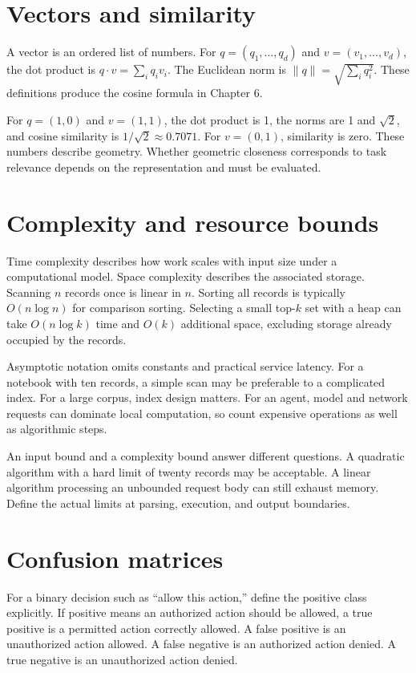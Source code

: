 \section{Vectors and similarity}
A vector is an ordered list of numbers. For \(q=(q_1,\ldots,q_d)\) and \(v=(v_1,\ldots,v_d)\), the dot product is \(q\cdot v=\sum_i q_i v_i\). The Euclidean norm is \(\lVert q\rVert=\sqrt{\sum_i q_i^2}\). These definitions produce the cosine formula in Chapter 6.

For \(q=(1,0)\) and \(v=(1,1)\), the dot product is 1, the norms are 1 and \(\sqrt{2}\), and cosine similarity is \(1/\sqrt{2}\approx0.7071\). For \(v=(0,1)\), similarity is zero. These numbers describe geometry. Whether geometric closeness corresponds to task relevance depends on the representation and must be evaluated.

\section{Complexity and resource bounds}
Time complexity describes how work scales with input size under a computational model. Space complexity describes the associated storage. Scanning \(n\) records once is linear in \(n\). Sorting all records is typically \(O(n\log n)\) for comparison sorting. Selecting a small top-\(k\) set with a heap can take \(O(n\log k)\) time and \(O(k)\) additional space, excluding storage already occupied by the records.

Asymptotic notation omits constants and practical service latency. For a notebook with ten records, a simple scan may be preferable to a complicated index. For a large corpus, index design matters. For an agent, model and network requests can dominate local computation, so count expensive operations as well as algorithmic steps.

An input bound and a complexity bound answer different questions. A quadratic algorithm with a hard limit of twenty records may be acceptable. A linear algorithm processing an unbounded request body can still exhaust memory. Define the actual limits at parsing, execution, and output boundaries.

\section{Confusion matrices}
For a binary decision such as “allow this action,” define the positive class explicitly. If positive means an authorized action should be allowed, a true positive is a permitted action correctly allowed. A false positive is an unauthorized action allowed. A false negative is an authorized action denied. A true negative is an unauthorized action denied.

